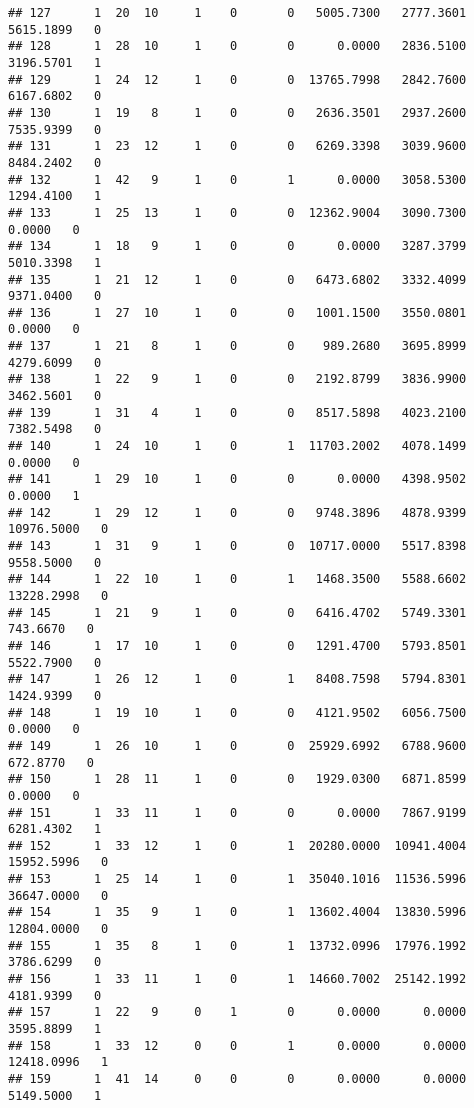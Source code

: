 \documentclass[
]{article}
\begin{document}
\begin{enumerate}
\begin{verbatim}
## 127      1  20  10     1    0       0   5005.7300   2777.3601   5615.1899   0
## 128      1  28  10     1    0       0      0.0000   2836.5100   3196.5701   1
## 129      1  24  12     1    0       0  13765.7998   2842.7600   6167.6802   0
## 130      1  19   8     1    0       0   2636.3501   2937.2600   7535.9399   0
## 131      1  23  12     1    0       0   6269.3398   3039.9600   8484.2402   0
## 132      1  42   9     1    0       1      0.0000   3058.5300   1294.4100   1
## 133      1  25  13     1    0       0  12362.9004   3090.7300      0.0000   0
## 134      1  18   9     1    0       0      0.0000   3287.3799   5010.3398   1
## 135      1  21  12     1    0       0   6473.6802   3332.4099   9371.0400   0
## 136      1  27  10     1    0       0   1001.1500   3550.0801      0.0000   0
## 137      1  21   8     1    0       0    989.2680   3695.8999   4279.6099   0
## 138      1  22   9     1    0       0   2192.8799   3836.9900   3462.5601   0
## 139      1  31   4     1    0       0   8517.5898   4023.2100   7382.5498   0
## 140      1  24  10     1    0       1  11703.2002   4078.1499      0.0000   0
## 141      1  29  10     1    0       0      0.0000   4398.9502      0.0000   1
## 142      1  29  12     1    0       0   9748.3896   4878.9399  10976.5000   0
## 143      1  31   9     1    0       0  10717.0000   5517.8398   9558.5000   0
## 144      1  22  10     1    0       1   1468.3500   5588.6602  13228.2998   0
## 145      1  21   9     1    0       0   6416.4702   5749.3301    743.6670   0
## 146      1  17  10     1    0       0   1291.4700   5793.8501   5522.7900   0
## 147      1  26  12     1    0       1   8408.7598   5794.8301   1424.9399   0
## 148      1  19  10     1    0       0   4121.9502   6056.7500      0.0000   0
## 149      1  26  10     1    0       0  25929.6992   6788.9600    672.8770   0
## 150      1  28  11     1    0       0   1929.0300   6871.8599      0.0000   0
## 151      1  33  11     1    0       0      0.0000   7867.9199   6281.4302   1
## 152      1  33  12     1    0       1  20280.0000  10941.4004  15952.5996   0
## 153      1  25  14     1    0       1  35040.1016  11536.5996  36647.0000   0
## 154      1  35   9     1    0       1  13602.4004  13830.5996  12804.0000   0
## 155      1  35   8     1    0       1  13732.0996  17976.1992   3786.6299   0
## 156      1  33  11     1    0       1  14660.7002  25142.1992   4181.9399   0
## 157      1  22   9     0    1       0      0.0000      0.0000   3595.8899   1
## 158      1  33  12     0    0       1      0.0000      0.0000  12418.0996   1
## 159      1  41  14     0    0       0      0.0000      0.0000   5149.5000   1

\end{verbatim}
\end{enumerate}
\end{document}
